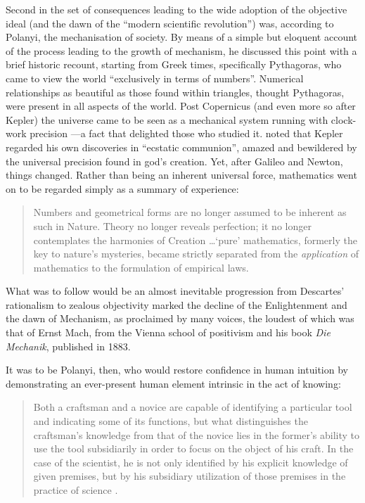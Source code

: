 Second in the set of consequences leading to the wide adoption of the objective ideal (and the dawn of the ``modern scientific revolution'') was, according to Polanyi, the mechanisation of society. By means of a simple but eloquent account of the process leading to the growth of mechanism, he discussed this point with a brief historic recount, starting from Greek times, specifically Pythagoras, who came to view the world ``exclusively in terms of numbers''. Numerical relationships as beautiful as those found within triangles, thought Pythagoras, were present in all aspects of the world. Post Copernicus (and even more so after Kepler) the universe came to be seen as a mechanical system running with clock-work precision ---a fact that delighted those who studied it. \citet[p.7]{polanyi58} noted that Kepler regarded his own discoveries in ``ecstatic communion'', amazed and bewildered by the universal precision found in god's creation. Yet, after Galileo and Newton, things changed. Rather than being an inherent universal force, mathematics went on to be regarded simply as a summary of experience:

\begin{quote}
Numbers and geometrical forms are no longer assumed to be inherent as such in Nature. Theory no longer reveals perfection; it no longer contemplates the harmonies of Creation \ldots `pure' mathematics, formerly the key to nature's mysteries, became strictly separated from the \emph{application} of mathematics to the formulation of empirical laws. \citep[p.28]{polanyi58}
\end{quote}

What was to follow would be an almost inevitable progression from Descartes' rationalism to zealous objectivity marked the decline of the Enlightenment and the dawn of Mechanism, as proclaimed by many voices, the loudest of which was that of Ernst Mach, from the Vienna school of positivism and his book \textit{Die Mechanik}, published in 1883. 

It was to be Polanyi, then, who would restore confidence in human intuition by demonstrating an ever-present human element intrinsic in the act of knowing:

\begin{quote}
Both a craftsman and a novice are capable of identifying a particular tool and indicating some of its functions, but what distinguishes the craftsman's knowledge from that of the novice lies in the former's ability to use the tool subsidiarily in order to focus on the object of his craft. In the case of the scientist, he is not only identified by his explicit knowledge of given premises, but by his subsidiary utilization of those premises in the practice of science \citep[pp23-24]{kane84}.
\end{quote}

